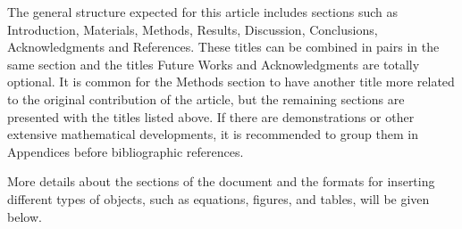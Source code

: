 The general structure expected for this article includes sections such as Introduction, Materials, Methods, Results, Discussion, Conclusions, Acknowledgments and References. These titles can be combined in pairs in the same section and the titles Future Works and Acknowledgments are totally optional. It is common for the Methods section to have another title more related to the original contribution of the article, but the remaining sections are presented with the titles listed above. If there are demonstrations or other extensive mathematical developments, it is recommended to group them in Appendices before bibliographic references.

More details about the sections of the document and the formats for inserting different types of objects, such as equations, figures, and tables, will be given below.